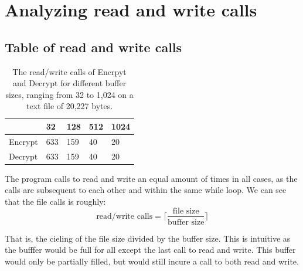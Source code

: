 \documentclass{article}
\begin{document}
\clearpage

\section*{Analyzing read and write calls}
\subsection*{Table of read and write calls}
  \begin{table}[htbp]
    \begin{tabularx}{\textwidth}{|X|X|X|X|X|}
    \hline
            & 32 & 128 & 512 & 1024 \\
    \hline
    Encrypt & 633 & 159 & 40 & 20 \\
    \hline
    Decrypt & 633 & 159 & 40 & 20 \\
    \hline
    \end{tabularx}
    \caption{The read/write calls of Encrpyt and Decrypt for different buffer sizes, ranging from 32 to 1,024 on a text file of 20,227 bytes.}
    \end{table}

The program calls to read and write an equal amount of times in all cases, as the calls are subsequent to each other and within the same while loop. 
We can see that the file calls is roughly:
\begin{equation*}
  \text{read/write calls} = \lceil\frac{\text{file size}}{\text{buffer size}} \rceil
  \end{equation*}

  That is, the cieling of the file size divided by the buffer size.
  This is intuitive as the bufffer would be full for all except the last call to read and write.
  This buffer would only be partially filled, but would still incure a call to both read and write.

\clearpage
\appendix
\end{document}
